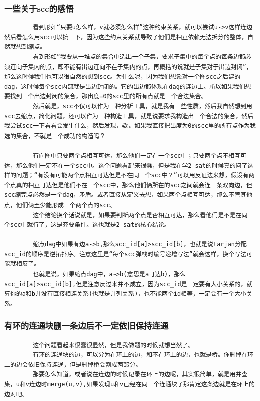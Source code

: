 \documentclass[10pt, a4paper, twocolumn]{article} %
\begin{document}
    \subsubsection{一些关于scc的感悟}
    \begin{lstlisting}
        看到形如“只要u怎么样，v就必须怎么样”这种约束关系，就可以尝试u->v这样连边然后看怎么用scc可以搞一下，因为这些约束关系就导致了他们是相互依赖无法拆分的整体，自然就想到缩点。
        看到形如“我要从一堆点的集合中选出一个子集，要求子集中的每个点的每条边都必须连向子集内的点，即不能有出边连向不在子集内的点，再概括的说就是子集对于出边封闭”，那么这时候我们也可以很自然的想到scc。为什么呢，因为我们想象对一个图scc之后建的dag，这时候每个scc内部就是出边封闭的。它的出边都体现在dag的连边上。所以如果我们想要找到一个出边封闭的集合，那出度=0的scc里的所有点就是一个合法集合。
        然后就是，scc不仅可以作为一种分析工具，就是我有一些性质，然后我自然想到用scc去缩点，简化问题，还可以作为一种构造工具，就是说要求我构造出一个合法的集合，然后我尝试scc一下看看会发生什么，然后发现，欸，如果我直接把出度为0的scc里的所有点作为我选的集合，不就是一个成功的构造吗？

        有向图中只要两个点相互可达，那么他们一定在一个scc中；只要两个点不相互可达，那么他们一定不在一个scc中。这个问题看起来很蠢，但是我在学2-sat的时候真的问了这样的问题；“有没有可能两个点相互可达但是不在同一个scc中？”可以用反证法来想，假设有两个点真的相互可达但是他们不在一个scc中，那么他们俩所在的scc之间就会连一条双向边，但scc缩完点必然是一个dag，矛盾。或者直接从定义去想，如果两个点相互可达，那么不管其他点，他们俩至少能形成一个两个点的scc。
        这个结论换个话说就是，如果要判断两个点是否相互可达，那么看他们是不是在同一个scc中就行了，这是充要条件。这也就是2-sat的核心结论。

        缩点dag中如果有边a->b,那么scc_id[a]>scc_id[b]，也就是说tarjan分配scc_id的顺序是逆拓扑序。注意这里是“每个scc弹栈时编号递增写法”就会这样，换个写法可能就相反了。
        也就是说，如果缩点dag中，a~>b(意思是a可达b)，那么scc_id[a]>scc_id[b],但是注意反过来并不成立，因为scc_id是一定要有大小关系的，就算你的a和b并没有直接相连关系(也就是并列关系)，也不能两个id相等，一定会有一个大小关系。
    \end{lstlisting}
    \subsubsection{有环的连通块删一条边后不一定依旧保持连通}
    \begin{lstlisting}
        这个问题看起来很蠢很显然，但是我做题的时候就想当然了。
        有环的连通块的边，可以分为在环上的边，和不在环上的边，也就是桥。你删掉在环上的边会依旧保持连通，但是删掉桥会割成两部分。
        那要怎么知道，或者说在连边的时候记录在环上的边呢，其实很简单，就是用并查集，u和v连边时merge(u,v),如果发现u和v已经在同一个连通块了那肯定这条边就是在环上的边对吧。
    \end{lstlisting}
\end{document}
